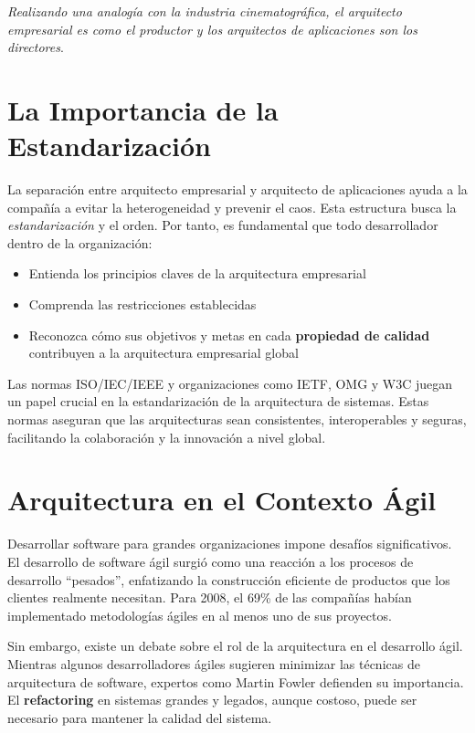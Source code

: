 \begin{remark}
\textit{Realizando una analogía con la industria cinematográfica, el arquitecto empresarial es como el productor y los arquitectos de aplicaciones son los directores}.
\end{remark}

\section{La Importancia de la Estandarización}

La separación entre arquitecto empresarial y arquitecto de aplicaciones ayuda a la compañía a evitar la heterogeneidad y prevenir el caos. Esta estructura busca la \textit{estandarización} y el orden. Por tanto, es fundamental que todo desarrollador dentro de la organización:
\begin{itemize}
    \item Entienda los principios claves de la arquitectura empresarial
    \item Comprenda las restricciones establecidas
    \item Reconozca cómo sus objetivos y metas en cada \textbf{propiedad de calidad} contribuyen a la arquitectura empresarial global
\end{itemize}

Las normas ISO/IEC/IEEE y organizaciones como IETF, OMG y W3C juegan un papel crucial en la estandarización de la arquitectura de sistemas. Estas normas aseguran que las arquitecturas sean consistentes, interoperables y seguras, facilitando la colaboración y la innovación a nivel global.

\section{Arquitectura en el Contexto Ágil}

Desarrollar software para grandes organizaciones impone desafíos significativos. El desarrollo de software ágil surgió como una reacción a los procesos de desarrollo ``pesados'', enfatizando la construcción eficiente de productos que los clientes realmente necesitan. Para 2008, el 69\% de las compañías habían implementado metodologías ágiles en al menos uno de sus proyectos.

Sin embargo, existe un debate sobre el rol de la arquitectura en el desarrollo ágil. Mientras algunos desarrolladores ágiles sugieren minimizar las técnicas de arquitectura de software, expertos como Martin Fowler defienden su importancia. El \textbf{refactoring} en sistemas grandes y legados, aunque costoso, puede ser necesario para mantener la calidad del sistema.

